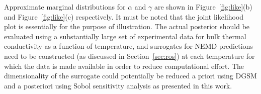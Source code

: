Approximate marginal distributions for
$\alpha$ and $\gamma$ are shown in Figure~\ref{fig:like}(b) and Figure~\ref{fig:like}(c) respectively. 
It must be noted that the joint likelihood plot is essentially for the purpose of illustration. The actual posterior
should be evaluated using a substantially large set of experimental data for bulk thermal conductivity as a function
of temperature, and surrogates for NEMD predictions
need to be constructed (as discussed in Section~\ref{sec:ros}) at each temperature for which the data is made
available in order to reduce computational effort. 
The dimensionality of the surrogate could potentially be reduced a priori using DGSM and a posteriori using
Sobol sensitivity analysis as presented in this work. 























